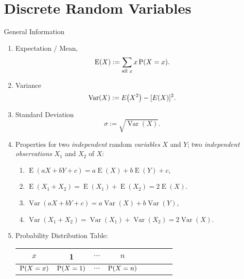 \documentclass[oneside]{book}
\begin{document}
\chapter{Discrete Random Variables}
\begin{stbox}{General Information}
  \begin{enumerate}
    \item Expectation / Mean, 
    \[\operatorname{E}(X):=\sum_{\text{all } x}{x\operatorname{P}(X=x)}.\]
    \item Variance 
    \[\operatorname{Var}(X):=E\hspace{-0.7mm}\left(X^2\right)-[E(X)]^2.\]
    \item Standard Deviation
    \[\sigma:=\sqrt{\operatorname{Var}(X)}.\]
    \item Properties for two \emph{independent} random \emph{variables} \(X\) and \(Y\); two \emph{independent observations} \(X_1\) and \(X_2\) of \(X\):
    \begin{enumerate}
      \item \(\operatorname{E}(aX+bY+c)=a\operatorname{E}(X)+b\operatorname{E}(Y)+c\),
      \item \(\operatorname{E}(X_1+X_2)=\operatorname{E}(X_1)+\operatorname{E}(X_2)=2\operatorname{E}(X)\).
      \item \(\operatorname{Var}(aX+bY+c)=a\operatorname{Var}(X)+b\operatorname{Var}(Y)\),
      \item \(\operatorname{Var}(X_1+X_2)=\operatorname{Var}(X_1)+\operatorname{Var}(X_2)=2\operatorname{Var}(X)\).
    \end{enumerate}
    \item Probability Distribution Table:
    \begin{tabular}{|Sc|Sc|Sc|Sc|}
      \hline
      \(x\) & 1 & \(\cdots\) & \(n\)\\
      \hline
      \(\operatorname{P}(X=x)\) & \(\operatorname{P}(X=1)\) & \(\cdots\) & \(\operatorname{P}(X=n)\)\\
      \hline
    \end{tabular}
  \end{enumerate}
\end{stbox}
\end{document}
